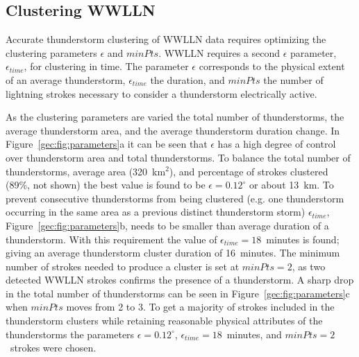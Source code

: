 \subsection{Clustering WWLLN}

Accurate thunderstorm clustering of WWLLN data requires optimizing the clustering parameters $\epsilon$ and $minPts$.
WWLLN requires a second $\epsilon$ parameter, $\epsilon_{time}$, for clustering in time.
The parameter $\epsilon$ corresponds to the physical extent of an average thunderstorm, $\epsilon_{time}$ the duration, and $minPts$ the number of lightning strokes necessary to consider a thunderstorm electrically active.

As the clustering parameters are varied the total number of thunderstorms, the average thunderstorm area, and the average thunderstorm duration change.
In Figure~\ref{gec:fig:parameters}a it can be seen that $\epsilon$ has a high degree of control over thunderstorm area and total thunderstorms.
To balance the total number of thunderstorms, average area (320~km$^2$), and percentage of strokes clustered (89\%, not shown) the best value is found to be $\epsilon = 0.12^\circ$ or about 13~km.
To prevent consecutive thunderstorms from being clustered (e.g. one thunderstorm occurring in the same area as a previous distinct thunderstorm storm) $\epsilon_{time}$, Figure~\ref{gec:fig:parameters}b, needs to be smaller than average duration of a thunderstorm.
With this requirement the value of $\epsilon_{time} = 18$~minutes is found; giving an average thunderstorm cluster duration of 16~minutes.
The minimum number of strokes needed to produce a cluster is set at $minPts = 2$, as two detected WWLLN strokes confirms the presence of a thunderstorm.
A sharp drop in the total number of thunderstorms can be seen in Figure~\ref{gec:fig:parameters}c when $minPts$ moves from 2 to 3.
To get a majority of strokes included in the thunderstorm clusters while retaining reasonable physical attributes of the thunderstorms the parameters $\epsilon = 0.12^\circ$, $\epsilon_{time} = 18$~minutes, and $minPts = 2$~strokes were chosen.

